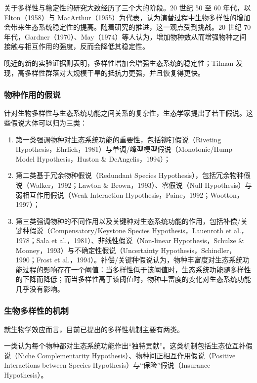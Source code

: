\documentclass[11pt,a4paper]{ctexart}
\begin{document}
关于多样性与稳定性的研究大致经历了三个大的阶段。20 世纪 50 至 60 年代，以 Elton（1958）与 MacArthur（1955）为代表，认为演替过程中生物多样性的增加会带来生态系统稳定性的提高\cite{ref9}。随着研究的推进，这一观点受到挑战。20 世纪 70 年代，Gardner（1970）、May（1974）等人\cite{ref6}认为，增加物种数从而增强物种之间接触与相互作用的强度，反而会降低其稳定性。

晚近的新的实验证据则表明，多样性增加会增强生态系统的稳定性；Tilman 发现，高多样性群落对大规模干旱的抵抗力更强，并且恢复得更快。

\subsubsection{物种作用的假说}

针对生物多样性与生态系统功能之间关系的复杂性，生态学家提出了若干假说。这些假说大体可以归为三类：

\begin{enumerate}
\item 第一类强调物种对生态系统功能的重要性，包括铆钉假说（Riveting Hypothesis，Ehrlich，1981）与单调/峰型模型假说（Monotonic/Hump Model Hypothesis，Huston \& DeAngelis，1994）；
\item 第二类基于冗余物种假说（Redundant Species Hypothesis），包括冗余物种假说（Walker，1992；Lawton \& Brown，1993）、零假说（Null Hypothesis）与弱相互作用假说（Weak Interaction Hypothesis，Paine，1992；Wootton，1997）；
\item 第三类强调物种的不同作用以及关键种对生态系统功能的作用，包括补偿/关键种假说（Compensatory/Keystone Species Hypothesis，Lauenroth et al.，1978；Sala et al.，1981）、非线性假说（Non-linear Hypothesis，Schulze \& Mooney，1993）与不确定性假说（Uncertainty Hypothesis，Schindler，1990；Frost et al.，1994）。补偿/关键种假说认为，物种丰富度对生态系统功能过程的影响存在一个阈值：当多样性低于该阈值时，生态系统功能随多样性的下降而降低；而当多样性高于该阈值时，物种丰富度的变化对生态系统功能几乎没有影响。
\end{enumerate}

\subsubsection{生物多样性的机制}

就生物学效应而言，目前已提出的多样性机制主要有两类。

一类认为每个物种都对生态系统功能作出“独特贡献”。这类机制包括生态位互补假说（Niche Complementarity Hypothesis）、物种间正相互作用假说（Positive Interactions between Species Hypothesis）与“保险”假说（Insurance Hypothesis）。
\end{document}
